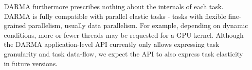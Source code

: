 DARMA furthermore prescribes nothing about the internals of each task.
DARMA is fully compatible with parallel elastic tasks - tasks with flexible fine-grained parallelism, usually data parallelism.
For example, depending on dynamic conditions, more or fewer threads may be requested for a GPU kernel.
Although the DARMA application-level API currently only allows expressing task granularity and task data-flow,
we expect the API to also express task elasticity in future versions.


